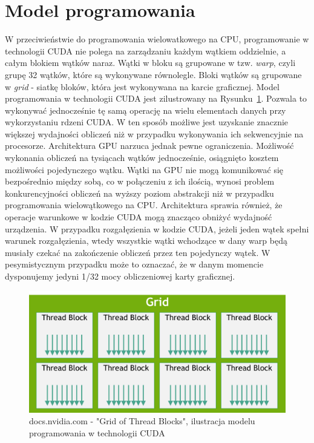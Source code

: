 \section{Model programowania}
W przeciwieństwie do programowania wielowatkowego na CPU, programowanie w technologii CUDA nie polega na zarządzaniu każdym wątkiem oddzielnie, a całym blokiem wątków naraz. Wątki w bloku są grupowane w tzw. \textit{warp}, czyli grupę 32 wątków, które są wykonywane równolegle. Bloki wątków są grupowane w \textit{grid} - siatkę bloków, która jest wykonywana na karcie graficznej. Model programowania w technologii CUDA jest zilustrowany na Rysunku~\ref{fig:Grid of Thread Blocks}. Pozwala to wykonywać jednocześnie tę samą operację na wielu elementach danych przy wykorzystaniu rdzeni CUDA. W ten sposób możliwe jest uzyskanie znacznie większej wydajności obliczeń niż w przypadku wykonywania ich sekwencyjnie na procesorze. Architektura GPU narzuca jednak pewne ograniczenia. Możliwość wykonania obliczeń na tysiącach wątków jednocześnie, osiągnięto kosztem możliwości pojedynczego wątku. Wątki na GPU nie mogą komunikować się bezpośrednio między sobą, co w połączeniu z ich ilością, wynosi problem konkurencyjności obliczeń na wyższy poziom abstrakcji niż w przypadku programowania wielowątkowego na CPU. Architektura sprawia również, że operacje warunkowe w kodzie CUDA mogą znacząco obniżyć wydajność urządzenia. W przypadku rozgałęzienia w kodzie CUDA, jeżeli jeden wątek spełni warunek rozgałęzienia, wtedy wszystkie wątki wchodzące w dany warp będą musiały czekać na zakończenie obliczeń przez ten pojedynczy wątek. W pesymistycznym przypadku może to oznaczać, że w danym momencie dysponujemy jedyni 1/32 mocy obliczeniowej karty graficznej.
\begin{figure}
    \centering
    \includegraphics[scale=0.5]{./fig/grid-of-thread-blocks.png}
    \caption{docs.nvidia.com - "Grid of Thread Blocks", ilustracja modelu programowania w technologii CUDA}
    \label{fig:Grid of Thread Blocks}
\end{figure}




